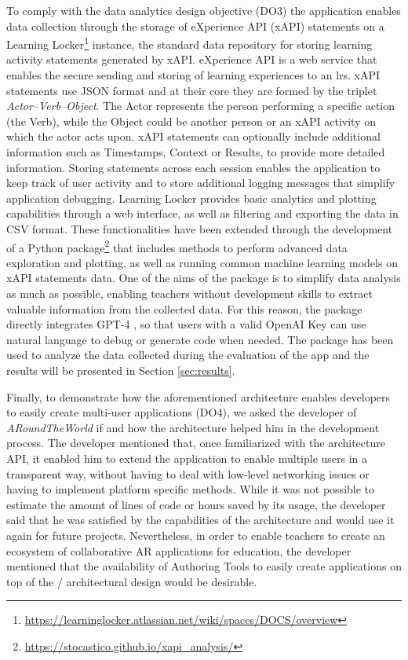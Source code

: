 \documentclass[pdflatex,sn-basic,iicol]{sn-jnl}%
\def\appname/{\textit{ARoundTheWorld}}
\begin{document}
To comply with the data analytics design objective (DO3) the application enables data collection through the storage of eXperience API (xAPI) statements on a Learning Locker\footnote{\url{https://learninglocker.atlassian.net/wiki/spaces/DOCS/overview}} instance, the standard data repository for storing learning activity statements generated by xAPI. eXperience API is a web service that enables the secure sending and storing of learning experiences to an \gls{lrs}. xAPI statements use JSON format and at their core they are formed by the triplet \textit{Actor--Verb--Object}. The Actor represents the person performing a specific action (the Verb), while the Object could be another person or an xAPI activity on which the actor acts upon. xAPI statements can optionally include additional information such as Timestamps, Context or Results, to provide more detailed information. Storing statements across each session enables the application to keep track of user activity and to store additional logging messages that simplify application debugging. Learning Locker provides basic analytics and plotting capabilities through a web interface, as well as filtering and exporting the data in CSV format. These functionalities have been extended through the development of a Python package\footnote{\url{https://stocastico.github.io/xapi_analysis/}} that includes methods to perform advanced data exploration and plotting, as well as running common machine learning models on xAPI statements data. One of the aims of the package is to simplify data analysis as much as possible, enabling teachers without development skills to extract valuable information from the collected data. For this reason, the package directly integrates GPT-4 \citep{openai2023gpt4, Osmulski_Ask_AI_-_2023}, so that users with a valid OpenAI Key can use natural language to debug or generate code when needed. The package has been used to analyze the data collected during the evaluation of the app and the results will be presented in Section \ref{sec:results}.

Finally, to demonstrate how the aforementioned architecture enables developers to easily create multi-user applications (DO4), we asked the developer of \appname/ if and how the architecture helped him in the development process. The developer mentioned that, once familiarized with the architecture API, it enabled him to extend the application to enable multiple users in a transparent way, without having to deal with low-level networking issues or having to implement platform specific methods. While it was not possible to estimate the amount of lines of code or hours saved by its usage, the developer said that he was satisfied by the capabilities of the architecture and would use it again for future projects. Nevertheless, in order to enable teachers to create an ecosystem of collaborative AR applications for education, the developer mentioned that the availability of Authoring Tools to easily create applications on top of the \clear/ architectural design would be desirable.
\end{document}
